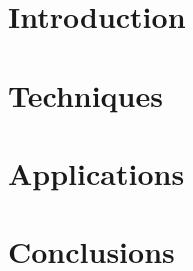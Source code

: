 \section[Intro]{Introduction}


\section[Tech]{Techniques}


\section[App]{Applications}



\section[Concl]{Conclusions}
